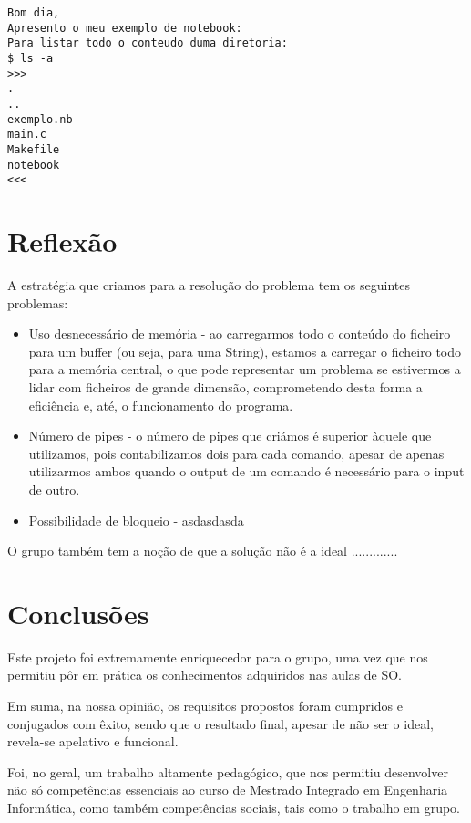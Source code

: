 \documentclass[a4paper]{article}
\begin{document}

\begin{lstlisting}[caption=Resultado do 3º Exemplo]
Bom dia,
Apresento o meu exemplo de notebook:
Para listar todo o conteudo duma diretoria:
$ ls -a
>>>
.
..
exemplo.nb
main.c
Makefile
notebook
<<<

\end{lstlisting}




\section{Reflexão}
\label{sec:reflexao}

A estratégia que criamos para a resolução do problema tem os seguintes problemas:

\begin{itemize}
  \item{Uso desnecessário de memória - ao carregarmos todo o conteúdo do ficheiro para um buffer (ou seja, para uma String), estamos a carregar o ficheiro 
  todo para a memória central, o que pode representar um problema se estivermos a lidar com ficheiros de grande dimensão, comprometendo desta forma a eficiência 
  e, até, o funcionamento do programa.}
  \item{Número de pipes - o número de pipes que criámos é superior àquele que utilizamos, pois contabilizamos dois para cada comando, apesar de apenas utilizarmos 
  ambos quando o output de um comando é necessário para o input de outro.}
  \item{Possibilidade de bloqueio - asdasdasda}
\end{itemize}

O grupo também tem a noção de que a solução não é a ideal .............


\section{Conclusões}
\label{sec:conclusao}

Este projeto foi extremamente enriquecedor para o grupo, uma vez que nos permitiu pôr em prática os conhecimentos adquiridos nas aulas de SO.

Em suma, na nossa opinião, os requisitos propostos foram cumpridos e conjugados com êxito, sendo que o resultado final, apesar de não ser o ideal, revela-se apelativo e funcional.

Foi, no geral, um trabalho  altamente pedagógico, que nos permitiu desenvolver não só competências essenciais ao curso de Mestrado Integrado em Engenharia Informática, como também competências sociais, tais como o trabalho em grupo.
\end{document}
